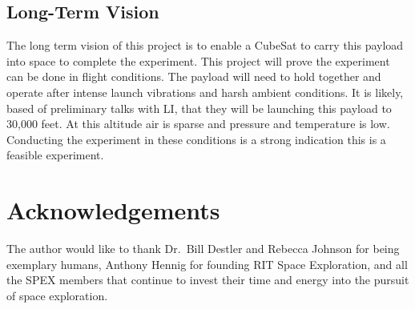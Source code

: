 \documentclass[conference]{IEEEtran} %
\begin{document}
\subsection{Long-Term Vision}
\label{sec:vision}
The long term vision of this project is to enable a CubeSat to carry this payload into space to complete the experiment. This project will prove the experiment can be done in flight conditions. 
The payload will need to hold together and operate after intense launch vibrations and harsh ambient conditions. It is likely, based of preliminary talks with LI, that they will be launching this 
payload to 30,000 feet. At this altitude air is sparse and pressure and temperature is low. Conducting the experiment in these conditions is a strong indication this is a feasible experiment. 

\section*{Acknowledgements}
The author would like to thank Dr.~Bill Destler and Rebecca Johnson for being exemplary humans, Anthony Hennig for founding RIT Space Exploration, and all the SPEX members that continue to invest their time and energy into the pursuit of space exploration.

%
%

\end{document}
